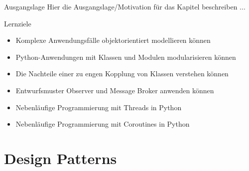 \begin{frame}{Ausgangslage}
    Hier die Ausgangslage/Motivation für das Kapitel beschreiben ...

\end{frame}

\begin{frame}{Lernziele}
    \begin{itemize}
        \item Komplexe Anwendungsfälle objektorientiert modellieren können
        \item Python-Anwendungen mit Klassen und Modulen modularisieren können
        \item Die Nachteile einer zu engen Kopplung von Klassen verstehen können
        \item Entwurfsmuster Observer und Message Broker anwenden können
        \item Nebenläufige Programmierung mit Threads in Python
        \item Nebenläufige Programmierung mit Coroutines in Python
    \end{itemize}
\end{frame}


\section{Design Patterns}

